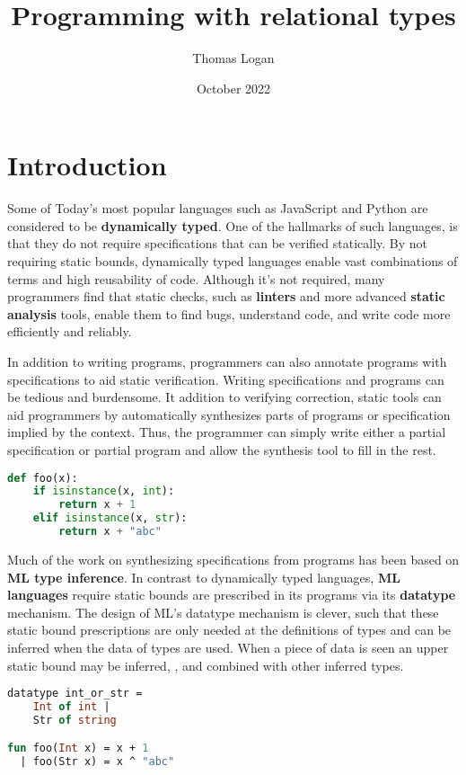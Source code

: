 \documentclass[sigplan,screen]{acmart}
\title{Programming with relational types}
\author{Thomas Logan}
\date{October 2022}
\begin{document}
\maketitle

\section{Introduction}
Some of Today's most popular languages such as JavaScript and Python are considered to be \textbf{dynamically typed}.
One of the hallmarks of such languages, is that they do not require specifications 
that can be verified statically. By not requiring static bounds, dynamically typed languages
enable vast combinations of terms and high reusability of code. 
Although it's not required, many programmers find that
static checks, such as \textbf{linters} and more advanced \textbf{static analysis} tools, 
enable them to find bugs, understand code, and write code more efficiently and reliably. 

In addition to writing programs, programmers can also annotate programs with specifications to
aid static verification. Writing specifications and programs can be tedious and burdensome.  
It addition to verifying correction, static tools can aid programmers by automatically synthesizes
parts of programs or specification implied by the context. Thus, the programmer can simply write
either a partial specification or partial program and allow the synthesis tool to fill in the rest.   

\begin{lstlisting}[language=Python]
def foo(x):
    if isinstance(x, int):
        return x + 1 
    elif isinstance(x, str): 
        return x + "abc"
\end{lstlisting}

Much of the work on synthesizing specifications from programs has been based on \textbf{ML type inference}.
In contrast to dynamically typed languages, \textbf{ML languages} require static bounds are prescribed 
in its programs via its \textbf{datatype} mechanism. The design of ML's datatype mechanism is clever, 
such that these static bound prescriptions are only needed at the definitions of types and can be 
inferred when the data of types are used. When a piece of data is seen an upper static bound 
may be inferred, , and combined with other inferred types.

\begin{lstlisting}[language=ML]
datatype int_or_str = 
    Int of int | 
    Str of string

fun foo(Int x) = x + 1
  | foo(Str x) = x ^ "abc"
\end{lstlisting}
\end{document}
